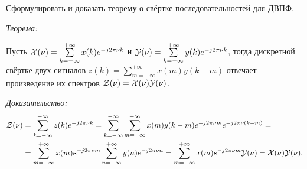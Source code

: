 \section{}
Сформулировать и доказать теорему о свёртке последовательностей для ДВПФ.

\textit{Теорема:}

Пусть $\mathcal{X}(\nu) = \sum\limits_{k = -\infty}^{+\infty}x(k)e^{-j 2 \pi \nu k}$ и $\mathcal{Y}(\nu) = \sum\limits_{k = -\infty}^{+\infty}y(k)e^{-j 2 \pi \nu k}$, тогда дискретной свёртке двух сигналов $z(k) = \sum \limits_{m = -\infty}^{+\infty} x(m)y(k-m)$ отвечает произведение их спектров $\mathcal{Z}(\nu) = \mathcal{X}(\nu)\mathcal{Y}(\nu)$.

\textit{Доказательство:}
\begin{align*}
	\mathcal{Z}(\nu) &= \sum\limits_{k = -\infty}^{+\infty}z(k)e^{-j 2 \pi \nu k} = \sum\limits_{k = -\infty}^{+\infty} \sum\limits_{m = -\infty}^{+\infty} x(m)y(k-m) e^{-j 2 \pi \nu m} e^{-j 2 \pi \nu (k - m)}  = \\
	&= \sum\limits_{m = -\infty}^{+\infty} x(m) e^{-j 2 \pi \nu m} \sum\limits_{n = -\infty}^{+\infty} y(n) e^{-j 2 \pi \nu n} = \sum\limits_{m = -\infty}^{+\infty} x(m) e^{-j 2 \pi \nu m} \mathcal{Y}(\nu) = \mathcal{X}(\nu) \mathcal{Y}(\nu).
\end{align*}
